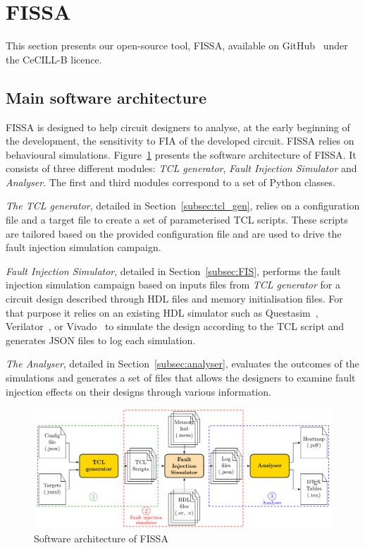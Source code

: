 \section{FISSA}
This section presents our open-source tool, FISSA, available on GitHub~\cite{fissa} under the CeCILL-B licence.

\subsection{Main software architecture}
FISSA is designed to help circuit designers to analyse, at the early beginning of the development, the sensitivity to FIA of the developed circuit. FISSA relies on behavioural simulations.
Figure~\ref{fig:archi_fissa} presents the software architecture of FISSA.
It consists of three different modules: \textit{TCL generator}, \textit{Fault Injection Simulator} and \textit{Analyser}. The first and third modules correspond to a set of Python classes.

\textit{The TCL generator}, detailed in Section~\ref{subsec:tcl_gen}, relies on a configuration file and a target file to create a set of parameterised TCL scripts. These scripts are tailored based on the provided configuration file and are used to drive the fault injection simulation campaign.

\textit{Fault Injection Simulator}, detailed in Section~\ref{subsec:FIS}, performs the fault injection simulation campaign based on inputs files from \textit{TCL generator} for a circuit design described through HDL files and memory initialisation files. For that purpose it relies on an existing HDL simulator such as Questasim~\cite{questasim}, Verilator~\cite{verilator}, or Vivado~\cite{vivado} to simulate the design according to the TCL script and generates JSON files to log each simulation.

\textit{The Analyser}, detailed in Section~\ref{subsec:analyser}, evaluates the outcomes of the simulations and generates a set of files that allows the designers to examine fault injection effects on their designs through various information.

\begin{figure}[ht]
    \centering
    \includegraphics[width=\textwidth, page=2]{c4_fissa/img/fissa/archi_fissa.pdf}
    \caption{Software architecture of FISSA}
    \label{fig:archi_fissa}
\end{figure}

